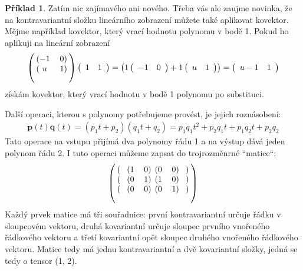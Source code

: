 \documentclass[a5paper,12pt]{amsbook}
\theoremstyle{definition}
\newtheorem{example}{Příklad}[chapter]
\newcommand{\myvec}[1]{\mathbf{#1}}
\begin{document}
\begin{example}
Zatím nic zajímavého ani nového. Třeba vás ale zaujme novinka, že na kontravariantní
složku lineárního zobrazení můžete také aplikovat kovektor. Mějme například kovektor,
který vrací hodnotu polynomu v bodě 1. Pokud ho aplikuji na lineární zobrazení
\begin{equation*}
\left(\begin{blockarray}{cc}
\begin{block}{(cc)}
-1 & 0 \\
\end{block}
\begin{block}{(cc)}
 u & 1 \\
\end{block}
\end{blockarray}\right)\left(
\begin{array}{cc}
1 & 1
\end{array}\right) = \left(
1\left(\begin{array}{cc}-1 & 0\end{array}\right) + 1\left(\begin{array}{cc}u & 1\end{array}\right)
\right) = \left(\begin{array}{cc}
u - 1 & 1
\end{array}\right)
\end{equation*}
získám kovektor, který vrací hodnotu v bodě 1 polynomu po substituci.

\medskip\noindent
Další operaci, kterou s polynomy potřebujeme provést, je jejich roznásobení:
\begin{equation*}
\begin{split}
\myvec{p}(t)\myvec{q}(t) = (p_1 t + p_2)(q_1 t + q_2) = p_1q_1t^2 + p_2q_1t + p_1q_2t + p_2q_2
\end{split}
\end{equation*}
Tato operace na vstupu přijímá dva polynomy řádu 1 a na výstup dává jeden polynom
řádu 2. I tuto operaci můžeme zapsat do trojrozměnrné ``matice``:
\begin{equation*}
\left(\begin{blockarray}{cccccc}
\begin{block}{(c(cc)(cc)c)}
& 1 & 0 & 0 & 0 &\\
\end{block}
\begin{block}{(c(cc)(cc)c)}
& 0 & 1 & 1 & 0 & \\
\end{block}
\begin{block}{(c(cc)(cc)c)}
& 0 & 0 & 0 & 1 &\\
\end{block}
\end{blockarray}\right)
\end{equation*}
Každý prvek matice má tři souřadnice: první kontravariantní určuje řádku v sloupcovém vektoru,
druhá kovariantní určuje sloupec prvního vnořeného řádkového vektoru a třetí kovariantní
opět sloupec druhého vnořeného řádkového vektoru. Matice tedy má jednu kontravariantní a dvě
kovariantní složky, jedná se tedy o tensor (1, 2).


\end{example}
\end{document}
